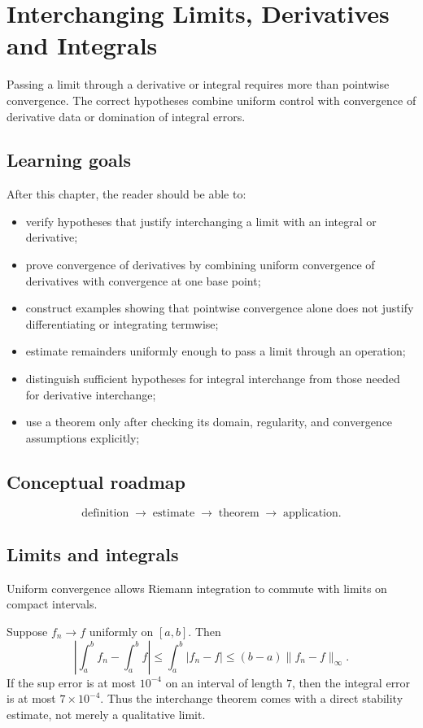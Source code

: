 \chapter{Interchanging Limits, Derivatives and Integrals}
\label{ch:ii12}

Passing a limit through a derivative or integral requires more than pointwise convergence. The correct hypotheses combine uniform control with convergence of derivative data or domination of integral errors.

\section*{Learning goals}
After this chapter, the reader should be able to:
\begin{itemize}
\item verify hypotheses that justify interchanging a limit with an integral or derivative;
\item prove convergence of derivatives by combining uniform convergence of derivatives with convergence at one base point;
\item construct examples showing that pointwise convergence alone does not justify differentiating or integrating termwise;
\item estimate remainders uniformly enough to pass a limit through an operation;
\item distinguish sufficient hypotheses for integral interchange from those needed for derivative interchange;
\item use a theorem only after checking its domain, regularity, and convergence assumptions explicitly;
\end{itemize}
\section*{Conceptual roadmap}
\[
\boxed{\text{definition}\;\longrightarrow\;\text{estimate}\;\longrightarrow\;\text{theorem}\;\longrightarrow\;\text{application}.}
\]

\section{Limits and integrals}
Uniform convergence allows Riemann integration to commute with limits on compact intervals.


\begin{example}\label{ex:ii12-expand-01}
Suppose \(f_n\to f\) uniformly on \([a,b]\). Then
\[
\left|\int_a^b f_n-\int_a^b f\right|
\le \int_a^b|f_n-f|
\le (b-a)\|f_n-f\|_\infty.
\]
If the sup error is at most \(10^{-4}\) on an interval of length \(7\), then
the integral error is at most \(7\times10^{-4}\). Thus the interchange theorem
comes with a direct stability estimate, not merely a qualitative limit.
\end{example}
